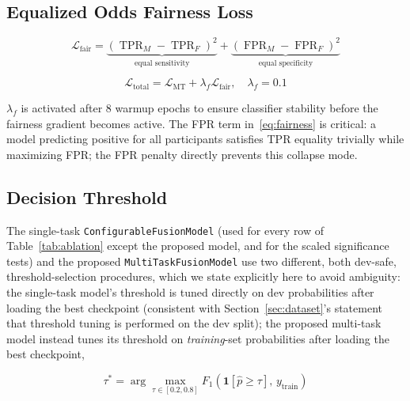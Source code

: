 \documentclass[journal]{IEEEtran}
\begin{document}
\subsection{Equalized Odds Fairness Loss}

\begin{equation}
\mathcal{L}_\text{fair} =
  \underbrace{(\operatorname{TPR}_M - \operatorname{TPR}_F)^2}_{\text{equal sensitivity}}
  + \underbrace{(\operatorname{FPR}_M - \operatorname{FPR}_F)^2}_{\text{equal specificity}}
\label{eq:fairness}
\end{equation}

\begin{equation}
\mathcal{L}_\text{total} = \mathcal{L}_\text{MT} +
  \lambda_f \mathcal{L}_\text{fair}, \quad \lambda_f=0.1
\label{eq:total}
\end{equation}

$\lambda_f$ is activated after 8 warmup epochs to ensure classifier
stability before the fairness gradient becomes active. The FPR term
in~\eqref{eq:fairness} is critical: a model predicting positive for
all participants satisfies TPR equality trivially while maximizing FPR;
the FPR penalty directly prevents this collapse mode.

\subsection{Decision Threshold}
\label{subsec:threshold}

The single-task \texttt{ConfigurableFusionModel} (used for every row
of Table~\ref{tab:ablation} except the proposed model, and for the
scaled significance tests) and the proposed
\texttt{MultiTaskFusionModel} use two different, both dev-safe,
threshold-selection procedures, which we state explicitly here to
avoid ambiguity: the single-task model's threshold is tuned directly
on dev probabilities after loading the best checkpoint (consistent
with Section~\ref{sec:dataset}'s statement that threshold tuning is
performed on the dev split); the proposed multi-task model instead
tunes its threshold on \emph{training}-set probabilities after
loading the best checkpoint,

\begin{equation}
\tau^* = \arg\max_{\tau \in [0.2, 0.8]}
  F_1\!\left(\mathbf{1}[\hat{p} \geq \tau],\, y_{\text{train}}\right)
\label{eq:threshold}
\end{equation}
\end{document}
